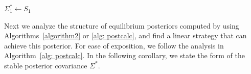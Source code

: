 \documentclass[12pt,journal,onecolumn]{IEEEtran}
\newcommand{\rknote}[1]{\noindent{\leavevmode\color{red}[Raj -- #1]}}
\begin{document}
\begin{algorithm}[t]
\caption{Finding an Equilibrium Posterior via SDP}\label{alg: postcalc}
\begin{algorithmic}[1]
\State $ \Sigma_{1}^* \gets S_{1}$
\end{algorithmic}
\end{algorithm}


Next we analyze the structure of equilibrium posteriors computed by using
Algorithms~\ref{algorithm2} or \ref{alg: postcalc}, and find a linear strategy that can achieve this posterior. For ease of exposition, we follow the analysis in Algorithm~\ref{alg: postcalc}. %
In the following corollary, we state the form of the stable posterior covariance $\Sigma^*$.  
\end{document}
